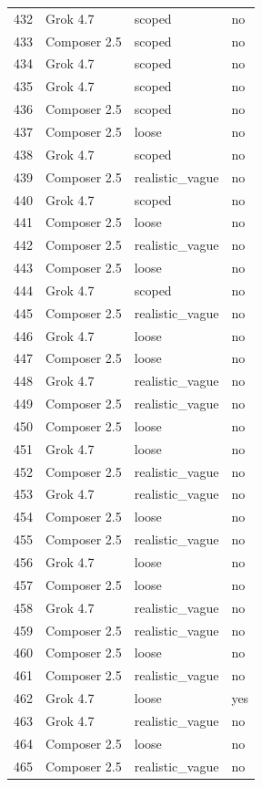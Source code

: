 \begin{tabular}{llll}
432 & Grok 4.7 & scoped & no \\
433 & Composer 2.5 & scoped & no \\
434 & Grok 4.7 & scoped & no \\
435 & Grok 4.7 & scoped & no \\
436 & Composer 2.5 & scoped & no \\
437 & Composer 2.5 & loose & no \\
438 & Grok 4.7 & scoped & no \\
439 & Composer 2.5 & realistic\_vague & no \\
440 & Grok 4.7 & scoped & no \\
441 & Composer 2.5 & loose & no \\
442 & Composer 2.5 & realistic\_vague & no \\
443 & Composer 2.5 & loose & no \\
444 & Grok 4.7 & scoped & no \\
445 & Composer 2.5 & realistic\_vague & no \\
446 & Grok 4.7 & loose & no \\
447 & Composer 2.5 & loose & no \\
448 & Grok 4.7 & realistic\_vague & no \\
449 & Composer 2.5 & realistic\_vague & no \\
450 & Composer 2.5 & loose & no \\
451 & Grok 4.7 & loose & no \\
452 & Composer 2.5 & realistic\_vague & no \\
453 & Grok 4.7 & realistic\_vague & no \\
454 & Composer 2.5 & loose & no \\
455 & Composer 2.5 & realistic\_vague & no \\
456 & Grok 4.7 & loose & no \\
457 & Composer 2.5 & loose & no \\
458 & Grok 4.7 & realistic\_vague & no \\
459 & Composer 2.5 & realistic\_vague & no \\
460 & Composer 2.5 & loose & no \\
461 & Composer 2.5 & realistic\_vague & no \\
462 & Grok 4.7 & loose & yes \\
463 & Grok 4.7 & realistic\_vague & no \\
464 & Composer 2.5 & loose & no \\
465 & Composer 2.5 & realistic\_vague & no \\

\end{tabular}
